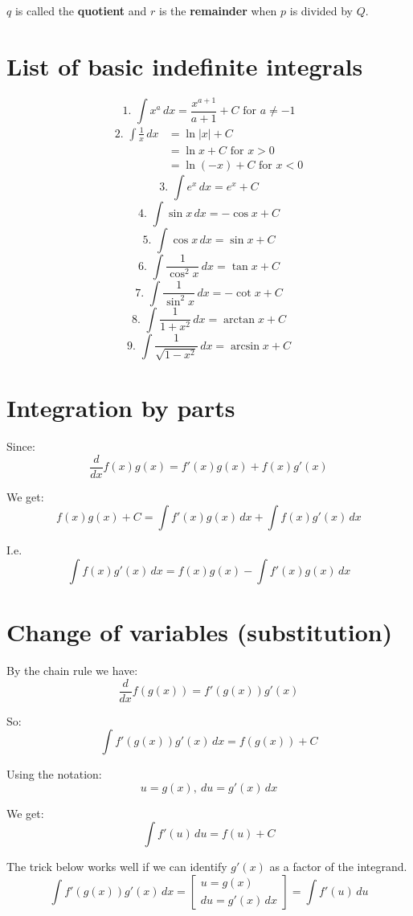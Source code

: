 \documentclass[11pt]{article}
\begin{document}
\(q\) is called the \textbf{quotient} and \(r\) is the \textbf{remainder} when \(p\) is divided by \(Q\).


\section{List of basic indefinite integrals}
\label{sec:org1bbb783}
\[\text{1. } \int x^a \, dx = \frac{x^{a + 1}}{a + 1} + C \text{ for } a \ne -1\]
\begin{align*}
\text{2. } \int \frac{1}{x} \, dx &= \ln |x| + C \\
&= \ln x + C \text{ for } x > 0 \\
&= \ln (-x) + C \text{ for } x < 0
\end{align*}
\[\text{3. } \int e^x \, dx = e^x + C\]
\[\text{4. } \int \sin x \, dx = - \cos x + C\]
\[\text{5. } \int \cos x \, dx = \sin x + C\]
\[\text{6. } \int \frac{1}{\cos^2 x} \, dx = \tan x + C\]
\[\text{7. } \int \frac{1}{\sin^2 x} \, dx = - \cot x + C\]
\[\text{8. } \int \frac{1}{1 + x^2} \, dx = \arctan x + C\]
\[\text{9. } \int \frac{1}{\sqrt{1 - x^2}} \, dx = \arcsin x + C\]


\section{Integration by parts}
\label{sec:orgd22749c}
Since:
\[\frac{d}{dx} f(x) g(x) = f'(x) g(x) + f(x) g'(x)\]

We get:
\[f(x) g(x) + C = \int f'(x) g(x) \, dx + \int f(x) g'(x) \, dx\]

I.e.
\[\int f(x) g'(x) \, dx = f(x) g(x) - \int f'(x) g(x) \, dx\]


\section{Change of variables (substitution)}
\label{sec:org097579e}
By the chain rule we have:
\[\frac{d}{dx} f(g(x)) = f'(g(x)) g'(x)\]

So:
\[\int f'(g(x)) g'(x) \, dx = f(g(x)) + C\]

Using the notation:
\[u = g(x), \ du = g'(x) \, dx\]

We get:
\[\int f'(u) \, du = f(u) + C\]

The trick below works well if we can identify \(g'(x)\) as a factor of the integrand.
\[\int f'(g(x)) g'(x) \, dx = \left[ \begin{gathered} u = g(x) \\ du = g'(x) \, dx \end{gathered} \right] = \int f'(u) \, du\]
\end{document}
